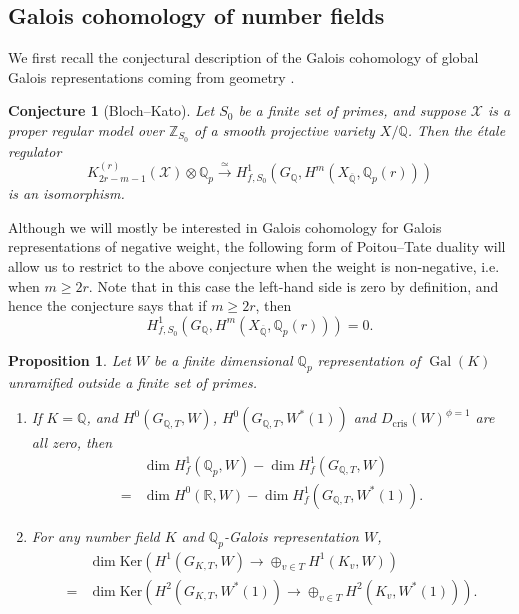 \documentclass[11pt]{amsart}
\def\Q{\mathbb Q}
\theoremstyle{plain}
\newtheorem{conjecture}{Conjecture}
\newtheorem{proposition}{Proposition}
\theoremstyle{definition}
\DeclareMathOperator{\Gal}{Gal}
\newcommand{\cris}{\mathrm{cris}}
\newcommand{\Ker}{\mathrm{Ker}}
\begin{document}
\subsection{Galois cohomology of number fields}
We first recall the conjectural description of the Galois cohomology of global Galois representations coming from geometry \cite{BK}.
\begin{conjecture}[Bloch--Kato]\label{conj:BK}
Let $S_0$ be a finite set of primes, and suppose $\mathcal{X}$ is a proper regular model over $\mathbb{Z}_{S_0 }$ of a smooth projective variety $X/\Q $. Then the \'etale regulator
\[
K_{2r-m-1} ^{(r)}(\mathcal{X})\otimes \Q _p \stackrel{\simeq }{\longrightarrow }H^1 _{f,S_0 } (G_\Q ,H^m (X_{\overline{\Q }},\Q _p (r)))
\]
is an isomorphism.
\end{conjecture}
Although we will mostly be interested in Galois cohomology for Galois representations of negative weight, the following form of Poitou--Tate duality will allow us to restrict to the above conjecture when the weight is non-negative, i.e. when $m\geq 2r$. Note that in this case the left-hand side is zero by definition, and hence the conjecture says that if $m\geq 2r$, then
\[
H^1 _{f,S_0 }(G_\Q ,H^m (X_{\overline{\Q }},\Q _p (r)))=0.
\]
\begin{proposition}
Let $W$ be a finite dimensional $\Q _p$ representation of $\Gal (K)$ unramified outside a finite set of primes.
\begin{enumerate}
\item \cite[Remark 1.2.4]{FPR94}

If $K=\Q $, and $H^0 (G_{\Q ,T},W)$, $H^0 (G_{\Q ,T},W^* (1))$ and $D_{\cris }(W)^{\phi =1}$ are all zero, then
\begin{align*}
& \dim H ^1 _f (\Q _p ,W)- \dim H ^1 _f (G_{\Q ,T},W) \\
= & \dim H^0 (\mathbb{R},W)- \dim H^1 _f (G_{\Q ,T},W^* (1)).
\end{align*}
\item \cite[1.2.2]{FPR94}

For any number field $K$ and $\Q _p $-Galois representation $W$,
\begin{align*}
& \dim \Ker (H^1 (G_{K,T},W)\to \oplus _{v\in T}H^1 (K_v ,W))  \\
= & \dim \Ker (H^2 (G_{K,T},W^* (1))\to \oplus _{v\in T}H^2 (K_v ,W^* (1))).
\end{align*}
\end{enumerate}
\end{proposition}
\end{document}

